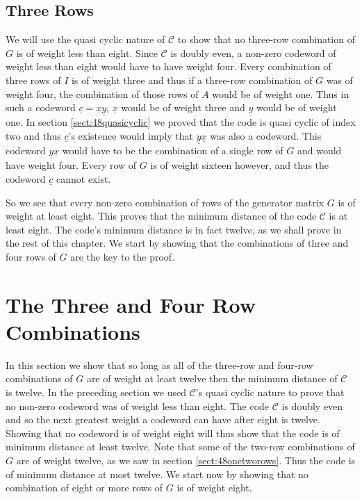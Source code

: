 \subsection{Three Rows}
We will use the quasi cyclic nature of $\mathcal{C}$ to show that no three-row combination of $G$ is of weight less than eight.
Since $\mathcal{C}$ is doubly even, a non-zero codeword of weight less than eight would have to have weight four.
Every combination of three rows of $I$ is of weight three and thus if a three-row combination of $G$ was of weight four, the combination of those rows of $A$ would be of weight one.
Thus in such a codeword $\underline{c} = \underline{x} \underline{y}$, $\underline{x}$ would be of weight three and $\underline{y}$ would be of weight one.
In section \ref{sect:48quasicyclic} we proved that the code is quasi cyclic of index two and thus $\underline{c}$'s existence would imply that $\underline{y} \underline{x}$ was also a codeword.
This codeword $\underline{y} \underline{x}$ would have to be the combination of a single row of $G$ and would have weight four.
Every row of $G$ is of weight sixteen however, and thus the codeword $\underline{c}$ cannot exist.

So we see that every non-zero combination of rows of the generator matrix $G$ is of weight at least eight.
This proves that the minimum distance of the code $\mathcal{C}$ is at least eight.
The code's minimum distance is in fact twelve, as we shall prove in the rest of this chapter.
We start by showing that the combinations of three and four rows of $G$ are the key to the proof.

\section{The Three and Four Row Combinations}
In this section we show that so long as all of the three-row and four-row combinations of $G$ are of weight at least twelve then the minimum distance of $\mathcal{C}$ is twelve.
In the preceding section we used $\mathcal{C}$'s quasi cyclic nature to prove that no non-zero codeword was of weight less than eight.
The code $\mathcal{C}$ is doubly even and so the next greatest weight a codeword can have after eight is twelve.
Showing that no codeword is of weight eight will thus show that the code is of minimum distance at least twelve.
Note that some of the two-row combinations of $G$ are of weight twelve, as we saw in section \ref{sect:48onetworows}.
Thus the code is of minimum distance at most twelve.
We start now by showing that no combination of eight or more rows of $G$ is of weight eight.

